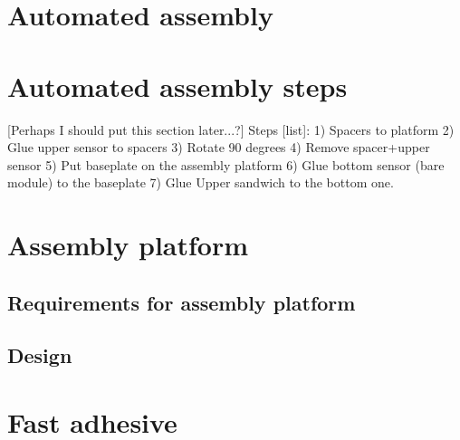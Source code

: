 \section{Automated assembly}

\section{Automated assembly steps}

[Perhaps I should put this section later...?]
Steps [list]:
1) Spacers to platform
2) Glue upper sensor to spacers
3) Rotate 90 degrees
4) Remove spacer+upper sensor
5) Put baseplate on the assembly platform
6) Glue bottom sensor (bare module) to the baseplate
7) Glue Upper sandwich to the bottom one.


\section{Assembly platform}




\subsection{Requirements for assembly platform}



\subsection{Design}



\section{Fast adhesive}

